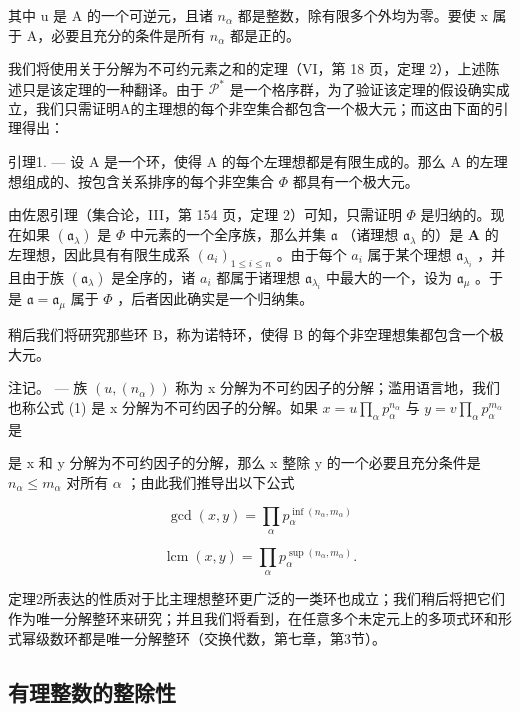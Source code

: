 其中 u 是 A 的一个可逆元，且诸 \(n_{\alpha}\) 都是整数，除有限多个外均为零。要使 x 属于 A，必要且充分的条件是所有 \(n_{\alpha}\) 都是正的。

我们将使用关于分解为不可约元素之和的定理（VI，第 18 页，定理 2），上述陈述只是该定理的一种翻译。由于 \(\mathcal{P}^*\) 是一个格序群，为了验证该定理的假设确实成立，我们只需证明A的主理想的每个非空集合都包含一个极大元；而这由下面的引理得出：

引理1. --- 设 A 是一个环，使得 A 的每个左理想都是有限生成的。那么 A 的左理想组成的、按包含关系排序的每个非空集合 \(\Phi\) 都具有一个极大元。

由佐恩引理（集合论，III，第 154 页，定理 2）可知，只需证明 \(\Phi\) 是归纳的。现在如果 \((\mathfrak{a}_{\lambda})\) 是 \(\Phi\) 中元素的一个全序族，那么并集 \(\mathfrak{a}\) （诸理想 \(\mathfrak{a}_{\lambda}\) 的）是 \(\mathbf{A}\) 的左理想，因此具有有限生成系 \((a_i)_{1 \leqslant i \leqslant n}\) 。由于每个 \(a_i\) 属于某个理想 \(\mathfrak{a}_{\lambda_i}\) ，并且由于族 \((\mathfrak{a}_{\lambda})\) 是全序的，诸 \(a_i\) 都属于诸理想 \(\mathfrak{a}_{\lambda_i}\) 中最大的一个，设为 \(\mathfrak{a}_{\mu}\) 。于是 \(\mathfrak{a} = \mathfrak{a}_{\mu}\) 属于 \(\Phi\) ，后者因此确实是一个归纳集。

稍后我们将研究那些环 B，称为诺特环，使得 B 的每个非空理想集都包含一个极大元。

注记。 --- 族 \((u, (n_{\alpha}))\) 称为 x 分解为不可约因子的分解；滥用语言地，我们也称公式 (1) 是 x 分解为不可约因子的分解。如果 \(x = u \prod_{\alpha} p_{\alpha}^{n_{\alpha}}\) 与 \(y = v \prod_{\alpha} p_{\alpha}^{m_{\alpha}}\) 是

是 x 和 y 分解为不可约因子的分解，那么 x 整除 y 的一个必要且充分条件是 \(n_{\alpha} \leqslant m_{\alpha}\) 对所有 \(\alpha\) ；由此我们推导出以下公式

\[
\operatorname * {g c d} (x, y) = \prod_ {\alpha} p _ {\alpha} ^ {\inf (n _ {\alpha}, m _ {\alpha})}\tag{2}
\]

\[
\operatorname{lcm} (x, y) = \prod_ {\alpha} p _ {\alpha} ^ {\sup \left(n _ {\alpha}, m _ {\alpha}\right)}.\tag{3}
\]

定理2所表达的性质对于比主理想整环更广泛的一类环也成立；我们稍后将把它们作为唯一分解整环来研究；并且我们将看到，在任意多个未定元上的多项式环和形式幂级数环都是唯一分解整环（交换代数，第七章，第3节）。

\subsection{有理整数的整除性}

